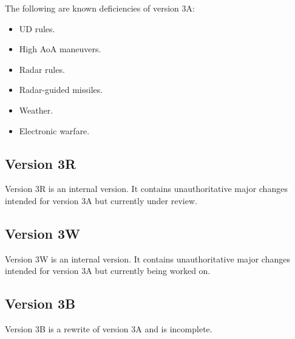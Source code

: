 \documentclass{report}
\begin{document}
The following are known deficiencies of version 3A:
\begin{itemize}
    \item UD rules.
    \item High AoA maneuvers.
    \item Radar rules.
    \item Radar-guided missiles.
    \item Weather.
    \item Electronic warfare.
\end{itemize}

\subsection{Version 3R}

Version 3R is an internal version. It contains unauthoritative major changes intended for version 3A but currently under review.



\subsection{Version 3W}

Version 3W is an internal version. It contains unauthoritative major changes intended for version 3A but currently being worked on.



\subsection{Version 3B}

Version 3B is a rewrite of version 3A and is incomplete.
\end{document}
